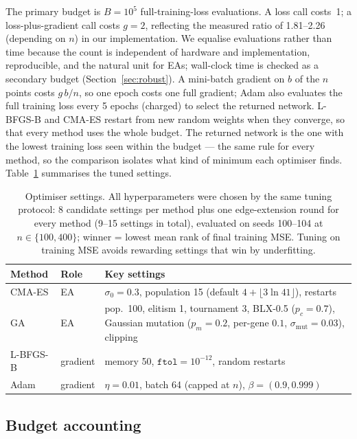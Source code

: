 \documentclass[11pt,a4paper]{article}
\newcommand{\cmaes}{CMA-ES}
\newcommand{\lbfgs}{L-BFGS-B}
\newcommand{\B}{B}
\begin{document}
The primary budget is $\B=10^5$ full-training-loss evaluations. A loss call costs~1; a
loss-plus-gradient call costs $g=2$, reflecting the measured ratio of 1.81--2.26 (depending on $n$) in
our implementation. We equalise evaluations rather than time because the count is independent of
hardware and implementation, reproducible, and the natural unit for EAs; wall-clock time is checked as a
secondary budget (Section~\ref{sec:robust}). A mini-batch gradient on $b$ of the $n$ points costs
$g\,b/n$, so one epoch costs one full gradient; Adam also evaluates the full training loss every 5
epochs (charged) to select the returned network. \lbfgs{} and \cmaes{} restart from new random weights
when they converge, so that every method uses the whole budget. The returned network is the one with the lowest training loss seen within
the budget --- the same rule for every method, so the comparison isolates what kind of minimum each
optimiser finds. Table~\ref{tab:optimisers} summarises the tuned settings.

\begin{table}[h]
  \centering
  \caption{Optimiser settings. All hyperparameters were chosen by the same tuning protocol:
  8 candidate settings per method plus one edge-extension round for every method (9--15 settings in total),
  evaluated on seeds 100--104 at $n\in\{100,400\}$; winner = lowest mean rank of
  final training MSE. Tuning on training MSE avoids rewarding settings that win by underfitting.}
  \label{tab:optimisers}
  \small
  \begin{tabularx}{\linewidth}{@{}l l X@{}}
    \toprule
    Method & Role & Key settings \\
    \midrule
    \cmaes{} & EA & $\sigma_0=0.3$, population 15 (default $4+\lfloor3\ln 41\rfloor$), restarts \\
    GA & EA & pop.\ 100, elitism 1, tournament 3, BLX-0.5 ($p_c=0.7$), Gaussian mutation
             ($p_m=0.2$, per-gene $0.1$, $\sigma_{\mathrm{mut}}=0.03$), clipping \\
    \lbfgs{} & gradient & memory 50, $\texttt{ftol}=10^{-12}$, random restarts \\
    Adam & gradient & $\eta=0.01$, batch 64 (capped at $n$), $\beta=(0.9,0.999)$ \citep{kingma2015adam} \\
    \bottomrule
  \end{tabularx}
\end{table}

\subsection{Budget accounting}
\end{document}
